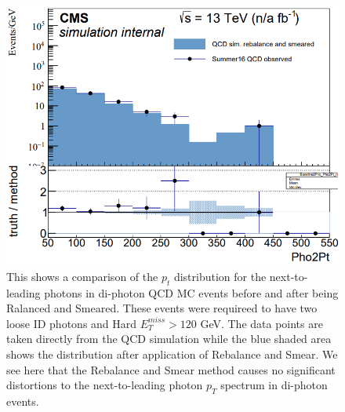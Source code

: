 \begin{figure}[h]
	\centering
	\includegraphics[width=0.9\linewidth]{Figures/RandS_Pho2_closure}
	\caption[Next-to-leading photon $p_T$ distrubutions for di-photon QCD MC events before and after Rebalance and Smear implimentation.]{This shows a comparison of the $p_t$ distribution for the next-to-leading photons in di-photon QCD MC events before and after being Ralanced and Smeared. These events were requireed to have two loose ID photons and Hard $E_T^{miss}>120$ GeV. The data points are taken directly from the QCD simulation while the blue shaded area shows the distribution after application of Rebalance and Smear. We see here that the Rebalance and Smear method causes no significant distortions to the next-to-leading photon $p_T$ spectrum in di-photon events.}
	\label{fig:randspho2closure}
\end{figure}

\label{section:RandS}
